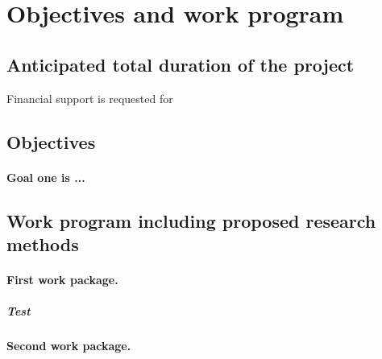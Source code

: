 \documentclass{scrartcl}
\begin{document}
\section{Objectives and work program}

\subsection{Anticipated total duration of the project}
Financial support is requested for 
\subsection{Objectives}
\goalstyle
\paragraph{Goal one is ...}

\subsection{Work program including proposed research methods}

\workpackagestyle
\hrulefill
\paragraph{First work package.}
\label{wp:1}
\subparagraph{Test}
\hrulefill
\paragraph{Second work package.}
\label{wp:2}



\standardstyle
\end{document}

